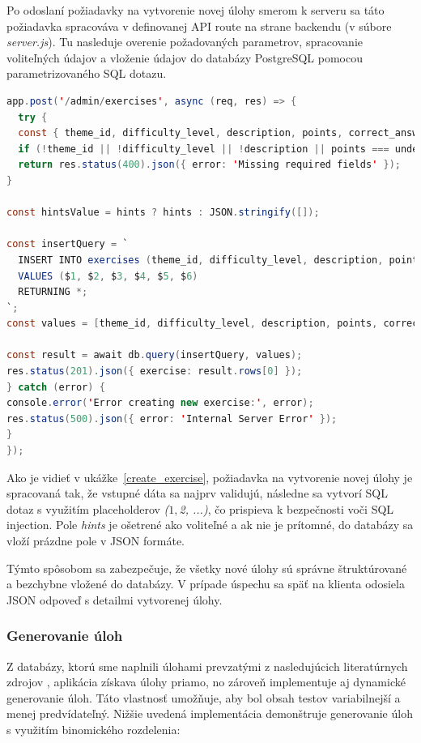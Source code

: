 Po odoslaní požiadavky na vytvorenie novej úlohy smerom k serveru sa táto požiadavka spracováva v definovanej API route na strane backendu (v súbore \textit{server.js}). 
Tu nasleduje overenie požadovaných parametrov, spracovanie voliteľných údajov a vloženie údajov do databázy PostgreSQL pomocou parametrizovaného SQL dotazu.
\begin{lstlisting}[caption={Serverová logika na spracovanie POST požiadavky pre vytvorenie úlohy}, label={create_exercise}, language=java, style=code-listing]
  app.post('/admin/exercises', async (req, res) => {
  try {
  const { theme_id, difficulty_level, description, points, correct_answer, hints } = req.body;
  if (!theme_id || !difficulty_level || !description || points === undefined || !correct_answer) {
  return res.status(400).json({ error: 'Missing required fields' });
}

const hintsValue = hints ? hints : JSON.stringify([]);

const insertQuery = `
  INSERT INTO exercises (theme_id, difficulty_level, description, points, correct_answer, hints)
  VALUES ($1, $2, $3, $4, $5, $6)
  RETURNING *;
`;
const values = [theme_id, difficulty_level, description, points, correct_answer, hintsValue];

const result = await db.query(insertQuery, values);
res.status(201).json({ exercise: result.rows[0] });
} catch (error) {
console.error('Error creating new exercise:', error);
res.status(500).json({ error: 'Internal Server Error' });
}
});
\end{lstlisting}

Ako je vidieť v ukážke~\ref{create_exercise}, požiadavka na vytvorenie novej úlohy je spracovaná tak, že vstupné dáta sa najprv validujú, následne sa vytvorí SQL dotaz s využitím placeholderov \textit{($1, $2, ...)}, čo prispieva k bezpečnosti voči SQL injection.
 Pole \textit{hints} je ošetrené ako voliteľné a ak nie je prítomné, do databázy sa vloží prázdne pole v JSON formáte.

Týmto spôsobom sa zabezpečuje, že všetky nové úlohy sú správne štruktúrované a bezchybne vložené do databázy. 
V prípade úspechu sa späť na klienta odosiela JSON odpoveď s detailmi vytvorenej úlohy.


\subsubsection*{Generovanie úloh}
Z databázy, ktorú sme naplnili úlohami prevzatými z nasledujúcich literatúrnych zdrojov \cite{nanasiova} \cite{volauf}, aplikácia získava úlohy priamo, no zároveň implementuje aj dynamické generovanie úloh. Táto vlastnosť umožňuje, aby bol obsah testov variabilnejší a menej predvídateľný. Nižšie uvedená implementácia demonštruje generovanie úloh s využitím binomického rozdelenia:

